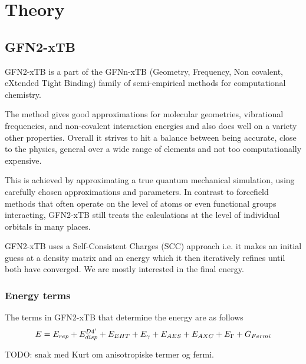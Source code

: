 \chapter{Theory}
\section{GFN2-xTB}
GFN2-xTB is a part of the GFNn-xTB (Geometry, Frequency, Non covalent, eXtended Tight Binding) family of semi-empirical methods for computational chemistry. 

The method gives good approximations for molecular geometries, vibrational frequencies, and non-covalent interaction energies and also does well on a variety other properties. 
Overall it strives to hit a balance between being accurate, close to the physics, general over a wide range of elements and not too computationally expensive.

This is achieved by approximating a true quantum mechanical simulation, using carefully chosen approximations and parameters. 
In contrast to forcefield methods that often operate on the level of atoms or even functional groups interacting, GFN2-xTB still treats the calculations at the level of individual orbitals in many places. 

GFN2-xTB uses a Self-Consistent Charges (SCC) approach i.e. it makes an initial guess at a density matrix and an energy which it then iteratively refines until both have converged. We are mostly interested in the final energy. 

\subsection{Energy terms}
The terms in GFN2-xTB that determine the energy are as follows
\begin{equation}
E =\E{rep}+\E{disp}^{D4'}+\E{EHT}+\E{\gamma}+\E{AES}+\E{AXC}+\E{\Gamma} + G_{Fermi}
\end{equation}

TODO: snak med Kurt om anisotropiske termer og fermi.

